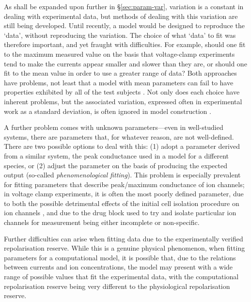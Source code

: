 \documentclass[../thesis-main.tex]{subfiles}
\begin{document}
 As shall be expanded upon further in \S\ref{sec:param-var}, variation is a constant in dealing with experimental data, but methods of dealing with this variation are still being developed. Until recently, a model would be designed to reproduce the `data', without reproducing the variation. The choice of what `data' to fit was therefore important, and yet fraught with difficulties. For example, should one fit to the maximum measured value on the basis that voltage-clamp experiments tend to make the currents appear smaller and slower than they are, or should one fit to the mean value in order to use a greater range of data? Both approaches have problems, not least that a model with mean parameters can fail to have properties exhibited by all of the test subjects \citep{Golowasch2002, Marder2011}. Not only does each choice have inherent problems, but the associated variation, expressed often in experimental work as a standard deviation, is often ignored in model construction \citep{Carusi2012}.
 
 A further problem comes with unknown parameters---even in well-studied systems, there are parameters that, for whatever reason, are not well-defined. There are two possible options to deal with this: (1) adopt a parameter derived from a similar system, \eg{} the peak conductance used in a model for a different species, or (2) adjust the parameter on the basis of producing the expected output (so-called \emph{phenomenological fitting}). This problem is especially prevalent for fitting parameters that describe peak/maximum conductance of ion channels; in voltage clamp experiments, it is often the most poorly defined parameter, due to both the possible detrimental effects of the initial cell isolation procedure on ion channels \citep{Yue1996}, and due to the drug block used to try and isolate particular ion channels for measurement being either incomplete or non-specific.
 
 Further difficulties can arise when fitting data due to the experimentally verified repolarisation reserve. While this is a genuine physical phenomenon, when fitting parameters for a computational model, it is possible that, due to the relations between currents and ion concentrations, the model may present with a wide range of possible values that fit the experimental data, with the computational repolarisation reserve being very different to the physiological repolarisation reserve.
 
\end{document}
